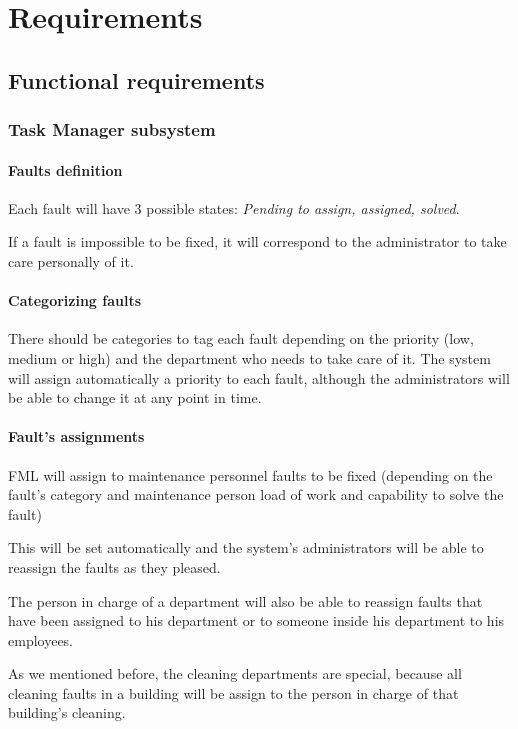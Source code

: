 \section{Requirements}

\subsection{Functional requirements}

\subsubsection{Task Manager subsystem}

\paragraph{Faults definition} Each fault will have 3 possible states: \textit{Pending to assign, assigned, solved}.

If a fault is impossible to be fixed, it will correspond to the administrator to take care personally of it.


\paragraph{Categorizing faults} There should be categories to tag each fault depending on the priority (low, medium or high) and the department who needs to take care of it. The system will assign automatically a priority to each fault, although the administrators will be able to change it at any point in time.

\paragraph{Fault's assignments} FML will assign to maintenance personnel faults to be fixed (depending on the fault's category and maintenance person load of work and capability to solve the fault)

This will be set automatically and the system's administrators will be able to reassign the faults as they pleased.

The person in charge of a department will also be able to reassign faults that have been assigned to his department or to someone inside his department to his employees.

As we mentioned before, the cleaning departments are special, because all cleaning faults in a building will be assign to the person in charge of that building's cleaning.


